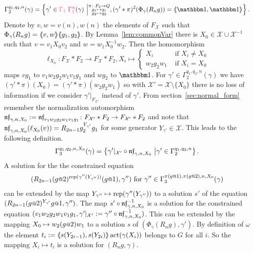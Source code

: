 \documentclass[a4paper,11pt]{amsart}
\newcommand\replaceTh[2]{\st{#1}{\color{DeepPink1}\ #2}}
\newcommand\remove[1]{{\color{Tomato1}#1}}
\begin{document}
 \[\Gamma_2^{q_1,q_2,n}(\gamma) = \left\{\gamma'\in \remove{\Gamma_1}\replaceTh{}{\Gamma_1^n}(\gamma) \bigmid \substack{\pi\colon F_2\to Q\\
										g_1\mapsto q_1 \\
										g_2\mapsto q_2 }, (\gamma'*\pi)^2(\Phi_\gamma(R_ng))=\pair{\id,\id}\right\}.\] 
 Denote by $v,w=v(n),w(n)$ the elements of $F_{\mathcal X}$ such that $\Phi_\gamma(R_ng)=\langle\negthickspace\langle v,w\rangle\negthickspace\rangle\langle\negthickspace\langle g_1,g_2\rangle\negthickspace\rangle$.
 By Lemma~\ref{lem:commonVar} there is 
 $X_0 \in \mathcal{X}\cup \mathcal{X}^{-1}$ such that $v=v_1X_0v_2$ and $w=w_1X_0^{-1}w_2$. Then the homomorphism
 \[\ell_{X_0}\colon F_{\mathcal{X}}*F_2\to F_{\mathcal{X}}*F_2, X_i \mapsto \begin{cases}
     X_i &\text{ if } X_i\neq {X_0} \\
     w_2g_2w_1 &\text{ if }X_i= {X_0} 
   \end{cases}
 \]
 maps $vg_1$ to $v_1w_2g_2w_1v_1g_1$ and $wg_2$ to $\id$.  For
 $\gamma'\in \Gamma_2^{q_1,q_2,n}(\gamma)$ we have
 $(\gamma'*\pi)(X_0)=({\gamma'*\pi})(w_2g_2w_1)$ so with
 $\mathcal X'=\mathcal X\setminus\{X_0\}$ there is no loss of information if we consider
 $\gamma'|_{F_{\mathcal X'}}$ instead of $\gamma'$.  From
 section~\ref{sec:normal_form} remember the normalization automorphism
 $\mathfrak{nf}_{\gamma,n,X_0}:=\mathfrak{nf}_{v_1w_2g_2w_1v_1g_1}\colon F_{\mathcal X'}*F_2 \to
 F_{\mathcal X'}*F_2$ and note that
 $\mathfrak{nf}_{\gamma,n,X_0}(\ell_{X_0}(v))=R_{2n-1}g_2^{{Y_{\gamma'}}}g_1$
 for some generator ${Y_{\gamma'}}\in\mathcal{X}$.  This leads to the
 following definition.
 \[\Gamma_3^{q_1,q_2,n,X_0}(\gamma) = \left\{\gamma'|_{\mathcal X'} \circ \mathfrak{nf}_{\gamma,n,X_0} \ \middle \vert \gamma' \in \Gamma_2^{q_1,q_2,n} \right\}.\] 
 A solution for the the constrained equation
 \[(R_{2n-1}(g\at2)^{\rep(\gamma''({Y_{\gamma''}}))}(g\at1),\gamma'')\textup{
     for }\gamma'' \in \Gamma_3^{\pi(g\at{1}),\pi(g\at{2}),n,X_0}(\gamma)\]
 can be extended by the map
 ${Y_{\gamma''}}\mapsto \operatorname{rep}(\gamma''({Y_{\gamma''}}))$ to a
 solution $s'$ of the equation
 $(R_{2n-1} (g\at{2})^{{Y_{\gamma'}}} g\at{1},\gamma'')$. The map
 $s'\circ \mathfrak{nf}_{\gamma,n,X_0}^{-1}$ is a solution for the constrained
 equation
 $(v_1w_2g_2w_1v_1g_1,\gamma'|_{\mathcal X'}:=\gamma'' \circ
 \mathfrak{nf}_{\gamma,n,X_0}^{-1})$.  This can be extended by the mapping
 $X_0\mapsto w_2(g\at{2})w_1$ to a solution $s$ of
 $(\Phi_\gamma(R_n g),\gamma')$.  By definition of $\omega$ the
 element $t_i:=\langle\negthickspace\langle s(Y_{2i-1}),s(Y_{2i})\rangle\negthickspace\rangle\operatorname{act}(\gamma(X_i))$ belongs
 to $G$ for all $i$. So the mapping $X_i\mapsto t_i$ is a solution for
 $(R_ng,\gamma)$.
 
\end{document}
